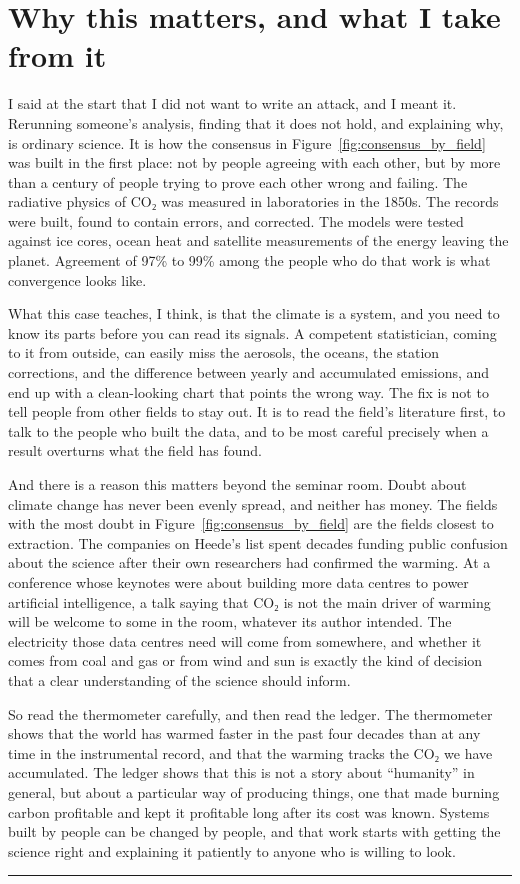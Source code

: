 \chapter{Why this matters, and what I take from it}

I said at the start that I did not want to write an attack, and I meant it. Rerunning someone's analysis, finding that it does not hold, and explaining why, is ordinary science. It is how the consensus in Figure~\ref{fig:consensus_by_field} was built in the first place: not by people agreeing with each other, but by more than a century of people trying to prove each other wrong and failing. The radiative physics of CO₂ was measured in laboratories in the 1850s. The records were built, found to contain errors, and corrected. The models were tested against ice cores, ocean heat and satellite measurements of the energy leaving the planet. Agreement of 97\% to 99\% among the people who do that work is what convergence looks like.

What this case teaches, I think, is that the climate is a system, and you need to know its parts before you can read its signals. A competent statistician, coming to it from outside, can easily miss the aerosols, the oceans, the station corrections, and the difference between yearly and accumulated emissions, and end up with a clean-looking chart that points the wrong way. The fix is not to tell people from other fields to stay out. It is to read the field's literature first, to talk to the people who built the data, and to be most careful precisely when a result overturns what the field has found.

And there is a reason this matters beyond the seminar room. Doubt about climate change has never been evenly spread, and neither has money. The fields with the most doubt in Figure~\ref{fig:consensus_by_field} are the fields closest to extraction. The companies on Heede's list spent decades funding public confusion about the science after their own researchers had confirmed the warming. At a conference whose keynotes were about building more data centres to power artificial intelligence, a talk saying that CO₂ is not the main driver of warming will be welcome to some in the room, whatever its author intended. The electricity those data centres need will come from somewhere, and whether it comes from coal and gas or from wind and sun is exactly the kind of decision that a clear understanding of the science should inform.

So read the thermometer carefully, and then read the ledger. The thermometer shows that the world has warmed faster in the past four decades than at any time in the instrumental record, and that the warming tracks the CO₂ we have accumulated. The ledger shows that this is not a story about ``humanity'' in general, but about a particular way of producing things, one that made burning carbon profitable and kept it profitable long after its cost was known. Systems built by people can be changed by people, and that work starts with getting the science right and explaining it patiently to anyone who is willing to look.

\begin{center}\rule{0.5\linewidth}{0.5pt}\end{center}
